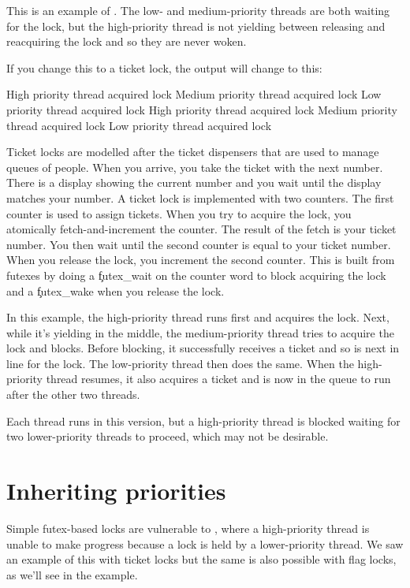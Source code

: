 This is an example of .
The low- and medium-priority threads are both waiting for the lock, but the high-priority thread is not yielding between releasing and reacquiring the lock and so they are never woken.

If you change this to a ticket lock, the output will change to this:

\begin{console}
High priority thread acquired lock
Medium priority thread acquired lock
Low priority thread acquired lock
High priority thread acquired lock
Medium priority thread acquired lock
Low priority thread acquired lock
\end{console}

Ticket locks are modelled after the ticket dispensers that are used to manage queues of people.
When you arrive, you take the ticket with the next number.
There is a display showing the current number and you wait until the display matches your number.
A ticket lock is implemented with two counters.
The first counter is used to assign tickets.
When you try to acquire the lock, you atomically fetch-and-increment the counter.
The result of the fetch is your ticket number.
You then wait until the second counter is equal to your ticket number.
When you release the lock, you increment the second counter.
This is built from futexes by doing a \c{futex_wait} on the counter word to block acquiring the lock and a \c{futex_wake} when you release the lock.

In this example, the high-priority thread runs first and acquires the lock.
Next, while it's yielding in the middle, the medium-priority thread tries to acquire the lock and blocks.
Before blocking, it successfully receives a ticket and so is next in line for the lock.
The low-priority thread then does the same.
When the high-priority thread resumes, it also acquires a ticket and is now in the queue to run after the other two threads.

Each thread runs in this version, but a high-priority thread is blocked waiting for two lower-priority threads to proceed, which may not be desirable.

\section[label=priority_inheritance]{Inheriting priorities}

Simple futex-based locks are vulnerable to , where a high-priority thread is unable to make progress because a lock is held by a lower-priority thread.
We saw an example of this with ticket locks but the same is also possible with flag locks, as we'll see in the  example.

